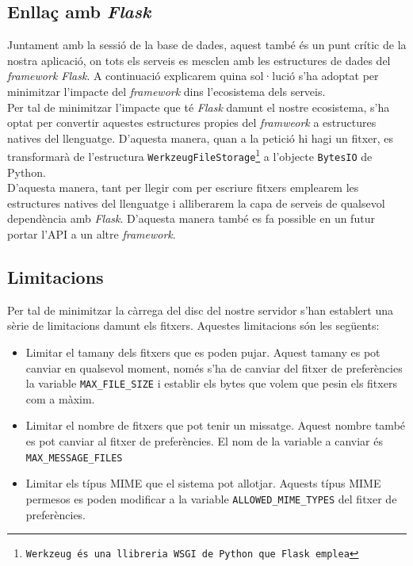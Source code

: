 \subsection{Enllaç amb \emph{Flask}}
Juntament amb la sessió de la base de dades, aquest també és un punt crític de la nostra aplicació, on tots els serveis es mesclen amb les estructures de dades del \emph{framework Flask}. A continuació explicarem quina sol·lució s'ha adoptat per minimitzar l'impacte del \emph{framework} dins l'ecosistema dels serveis.\\

Per tal de minimitzar l'impacte que té \emph{Flask} damunt el nostre ecosistema, s'ha optat per convertir aquestes estructures propies del \emph{framweork} a estructures natives del llenguatge. D'aquesta manera, quan a la petició hi hagi un fitxer, es transformarà de l'estructura \texttt{WerkzeugFileStorage\footnote{Werkzeug és una llibreria WSGI de Python que Flask emplea}} a l'objecte \texttt{BytesIO} de Python.\\

D'aquesta manera, tant per llegir com per escriure fitxers emplearem les estructures natives del llenguatge i alliberarem la capa de serveis de qualsevol dependència amb \emph{Flask}. D'aquesta manera també es fa possible en un futur portar l'\ac{API} a un altre \emph{framework}. 

\subsection{Limitacions}
Per tal de minimitzar la càrrega del disc del nostre servidor s'han establert una sèrie de limitacions damunt els fitxers. Aquestes limitacions són les següents:

\begin{itemize}
	\item Limitar el tamany dels fitxers que es poden pujar. Aquest tamany es pot canviar en qualsevol moment, només s'ha de canviar del fitxer de preferències la variable \verb$MAX_FILE_SIZE$ i establir els bytes que volem que pesin els fitxers com a màxim.
	\item Limitar el nombre de fitxers que pot tenir un missatge. Aquest nombre també es pot canviar al fitxer de preferències. El nom de la variable a canviar és \verb$MAX_MESSAGE_FILES$
	\item Limitar els típus \ac{MIME} que el sistema pot allotjar. Aquests típus \ac{MIME} permesos es poden modificar a la variable \verb$ALLOWED_MIME_TYPES$ del fitxer de preferències.
\end{itemize}
	
